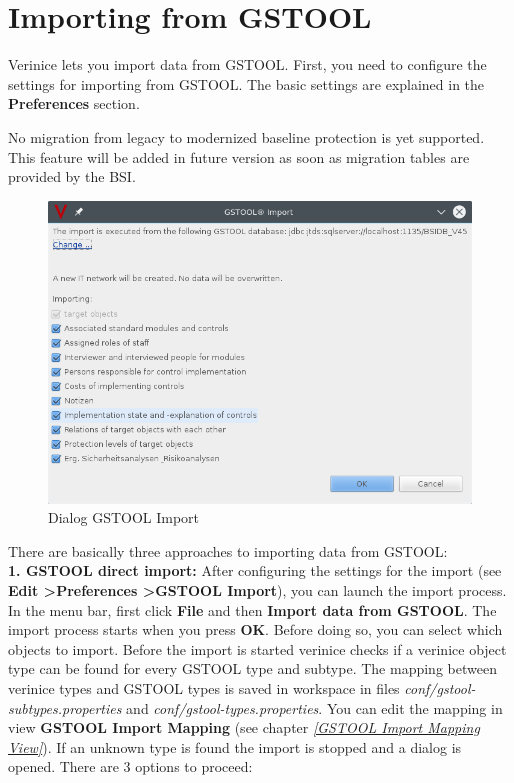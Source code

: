 \documentclass[a4paper,10pt]{book}
\begin{document}
\section{Importing from GSTOOL} \label{Importing from GSTOOL}
Verinice lets you import data from GSTOOL. First, you need to configure the settings for importing from GSTOOL.
The basic settings are explained in the \textbf{Preferences} section.

No migration from legacy to modernized baseline protection is yet supported.
This feature will be added in future version as soon as
migration tables are provided by the BSI.

\begin{figure}[htb!]
  \centering
  \includegraphics[scale=.5]{Screenshot/gstool-import-dialog.png}
  \caption{\label{Dialog GSTOOL Import} Dialog GSTOOL Import}
\end{figure}
There are basically three approaches to
importing data from GSTOOL:
\newline\\
\textbf{1. \textsc{GSTOOL} direct import:} After configuring the settings for the import (see \textbf{Edit
\textgreater}{\textbf{Preferences \textgreater}}\textbf{\textsc{GSTOOL} Import}), you can launch the import process.
In the menu bar, first click \textbf{File} and then \textbf{Import data from GSTOOL}.
The import process starts when you press \textbf{OK}. Before doing so, you can select which objects to import.
Before the import is started verinice checks if a verinice object type can be found for every GSTOOL type and subtype. The mapping between verinice types and GSTOOL types is saved in workspace in files \textit{conf/gstool-subtypes.properties} and \textit{conf/gstool-types.properties}. You can edit the mapping in view \textbf{GSTOOL Import Mapping} (see chapter {\em \ref{GSTOOL Import Mapping View}}). If an unknown type is found the import is stopped and a dialog is opened. There are 3 options to proceed:
\end{document}

